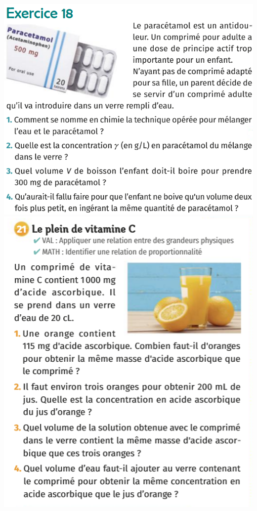 \begin{center}
\includegraphics[scale=0.9]{Images/Chapitre_2/Exo_paracetamol.PNG}
\includegraphics[scale=1.5]{Images/Chapitre_2/Ex_21.png}
\end{center}
